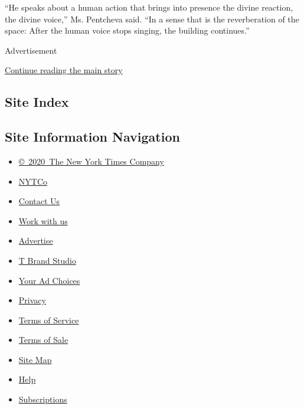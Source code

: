 ``He speaks about a human action that brings into presence the divine
reaction, the divine voice,'' Ms. Pentcheva said. ``In a sense that is
the reverberation of the space: After the human voice stops singing, the
building continues.''

Advertisement

\protect\hyperlink{after-bottom}{Continue reading the main story}

\hypertarget{site-index}{%
\subsection{Site Index}\label{site-index}}

\hypertarget{site-information-navigation}{%
\subsection{Site Information
Navigation}\label{site-information-navigation}}

\begin{itemize}
\tightlist
\item
  \href{https://help.nytimes3xbfgragh.onion/hc/en-us/articles/115014792127-Copyright-notice}{©~2020~The
  New York Times Company}
\end{itemize}

\begin{itemize}
\tightlist
\item
  \href{https://www.nytco.com/}{NYTCo}
\item
  \href{https://help.nytimes3xbfgragh.onion/hc/en-us/articles/115015385887-Contact-Us}{Contact
  Us}
\item
  \href{https://www.nytco.com/careers/}{Work with us}
\item
  \href{https://nytmediakit.com/}{Advertise}
\item
  \href{http://www.tbrandstudio.com/}{T Brand Studio}
\item
  \href{https://www.nytimes3xbfgragh.onion/privacy/cookie-policy\#how-do-i-manage-trackers}{Your
  Ad Choices}
\item
  \href{https://www.nytimes3xbfgragh.onion/privacy}{Privacy}
\item
  \href{https://help.nytimes3xbfgragh.onion/hc/en-us/articles/115014893428-Terms-of-service}{Terms
  of Service}
\item
  \href{https://help.nytimes3xbfgragh.onion/hc/en-us/articles/115014893968-Terms-of-sale}{Terms
  of Sale}
\item
  \href{https://spiderbites.nytimes3xbfgragh.onion}{Site Map}
\item
  \href{https://help.nytimes3xbfgragh.onion/hc/en-us}{Help}
\item
  \href{https://www.nytimes3xbfgragh.onion/subscription?campaignId=37WXW}{Subscriptions}
\end{itemize}

